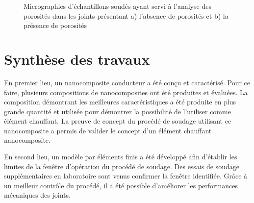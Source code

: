 \begin{figure}[h!]
	\centering
	 \qquad
	\caption{Micrographies d'échantillons soudés ayant servi à l'analyse des porosités dans les joints présentant a) l'absence de porosités et b) la présence de porosités}
	\label{fig:micro_analyse_porosite}
\end{figure}

\FloatBarrier
\section{Synthèse des travaux}

%

En premier lieu, un nanocomposite conducteur a été conçu et caractérisé. 
Pour ce faire, plusieurs compositions de nanocomposites ont été produites et évaluées. 
La composition démontrant les meilleures caractéristiques a été produite en plus grande quantité et utilisée pour démontrer la possibilité de l'utiliser comme élément chauffant. 
La preuve de concept du procédé de soudage utilisant ce nanocomposite a permis de valider le concept d'un élément chauffant nanocomposite. 

En second lieu, un modèle par éléments finis a été développé afin d'établir les limites de la fenêtre d'opération du procédé de soudage. 
Des essais de soudage supplémentaires en laboratoire sont venus confirmer la fenêtre identifiée. 
Grâce à un meilleur contrôle du procédé, il a été possible d'améliorer les performances mécaniques des joints. 

